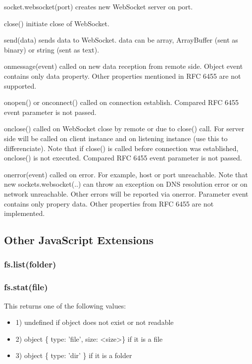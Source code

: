 \begin{itemize}
{\item socket.websocket(port) creates new WebSocket server on port.
\item close() initiate close of WebSocket.
\item send(data) sends data to WebSocket. data can be array, ArrayBuffer (sent as binary) or string (sent as text).
\item onmessage(event) called on new data reception from remote side. Object event contains only data property. Other properties mentioned in RFC 6455 are not supported.
\item onopen() or onconnect() called on connection establish. Compared RFC 6455 event parameter is not passed.
\item onclose() called on WebSocket close by remote or due to close() call. For server side will be called on client instance and on listening instance (use this to differenciate). Note that if close() is called before connection was established, onclose() is not executed. Compared RFC 6455 event parameter is not passed.
\item onerror(event) called on error. For example, host or port unreachable. Note that new sockets.websocket(..) can throw an exception on DNS resolution error or on network unreachable. Other errors will be reported via onerror. Parameter event contains only propery data. Other properties from RFC 6455 are not implemented.}
\end{itemize}

\subsection{Other JavaScript Extensions}

\subsubsection{fs.list(folder)}



\subsubsection{fs.stat(file)}

This returns one of the following values:

\begin{itemize}
\item 1) undefined if object does not exist or not readable
\item 2) object \{ type: 'file', size: \textless{}size\textgreater{}\} if it is a file
\item 3) object \{ type: 'dir' \} if it is a folder
\end{itemize}


